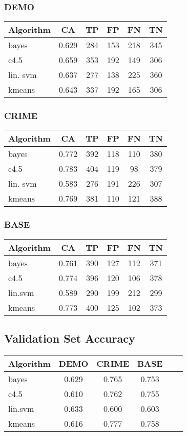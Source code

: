 \documentclass[]{article}
\begin{document}
\subsubsection{DEMO}
\begin{tabular}{|l|c|c|c|c|c|}
\hline
Algorithm & CA & TP & FP & FN & TN \\
\hline
bayes  &  0.629 & 284  &  153  &  218  &  345  \\
c4.5   &  0.659 & 353  &  192  &  149  &  306  \\
lin. svm & 0.637 & 277  &  138  &  225  &  360  \\
kmeans  & 0.643 & 337  &  192  &  165  &  306  \\
\hline
\end{tabular}

\subsubsection{CRIME}
\begin{tabular}{|l|c|c|c|c|c|}
\hline
Algorithm & CA & TP & FP & FN & TN \\
\hline
bayes  &  0.772  & 392 &   118 &   110 &   380  \\
c4.5   &  0.783 & 404  &  119 &   98   &  379  \\
lin. svm & 0.583 & 276  &  191 &   226  &  307  \\
kmeans  & 0.769 & 381  &  110 &   121  &  388  \\
\hline
\end{tabular}

\subsubsection{BASE}
\begin{tabular}{|l|c|c|c|c|c|}
\hline
Algorithm & CA & TP & FP & FN & TN \\
\hline
bayes   & 0.761  &  390  &  127  &  112  &  371  \\
c4.5    & 0.774  &  396  &  120  &  106  &  378  \\
lin.svm & 0.589  &  290  &  199  &  212  &  299  \\
kmeans  & 0.773  &  400  &  125  &  102  &  373  \\
\hline
\end{tabular}

\subsection{Validation Set Accuracy}
\begin{tabular}{|l|c|c|c|c|c|}
\hline
Algorithm & DEMO & CRIME & BASE \\
\hline
bayes  &  0.629 & 0.765  &  0.753   \\
c4.5   &  0.610 & 0.762  &  0.755  \\
lin.svm & 0.633 & 0.600  &  0.603   \\
kmeans  & 0.616 & 0.777  &  0.758   \\
\hline
\end{tabular}
\end{document}

